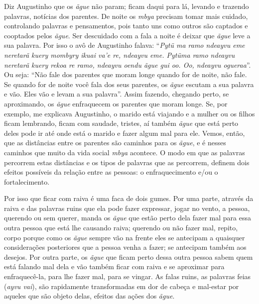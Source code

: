 Diz Augustinho que os \emph{ãgue} não param; ficam daqui para lá,
levando e trazendo palavras, notícias dos parentes. De noite os
\emph{mbya} precisam tomar mais cuidado, controlando palavras e
pensamentos, pois tanto uns como outros são captados e cooptados pelos
\emph{ãgue}. Ser descuidado com a fala a noite é deixar que \emph{ãgue}
leve a sua palavra. Por isso o avô de Augustinho falava: ``\emph{Pytü ma
ramo ndeayvu eme neretarã kuery mombyry ikuai va'e re, ndeayvu eme.
Pytüma ramo ndeayvu neretarã kuery rekoa re ramo, ndeayvu oendu ãgue gui
oo. Oo, ndeayvu ogueraa}''. Ou seja: ``Não fale dos parentes que moram
longe quando for de noite, não fale. Se quando for de noite você fala
dos seus parentes, os \emph{ãgue} escutam a sua palavra e vão. Eles vão
e levam a sua palavra''. Assim fazendo, chegando perto, se aproximando,
os \emph{ãgue} enfraquecem os parentes que moram longe. Se, por exemplo,
me explicava Augustinho, o marido está viajando e a mulher ou os filhos
ficam lembrando, ficam com saudade, tristes, aí também \emph{ãgue} que
está perto deles pode ir até onde está o marido e fazer algum mal para
ele. Vemos, então, que as distâncias entre os parentes são caminhos para
os \emph{ãgue}, e é nesses caminhos que muito da vida social \emph{mbya}
acontece. O modo em que as palavras percorrem estas distâncias e os
tipos de palavras que as percorrem, definem dois efeitos possíveis da
relação entre as pessoas: o enfraquecimento e/ou o fortalecimento.

Por isso que ficar com raiva é uma faca de dois gumes. Por uma parte,
através da raiva e das palavras ruins que ela pode fazer expressar,
jogar no vento, a pessoa, querendo ou sem querer, manda os \emph{ãgue}
que estão perto dela fazer mal para essa outra pessoa que está lhe
causando raiva; querendo ou não fazer mal, repito, corpo porque como os
\emph{ãgue} sempre vão na frente eles se antecipam a quaisquer
considerações posteriores que a pessoa venha a fazer; se antecipam
também aos desejos. Por outra parte, os \emph{ãgue} que ficam perto
dessa outra pessoa sabem quem está falando mal dela e vão também ficar
com raiva e se aproximar para enfraquecê-la, para lhe fazer mal, para se
vingar. As falas ruins, as palavras feias (\emph{ayvu vai}), são
rapidamente transformadas em dor de cabeça e mal-estar por aqueles que
são objeto delas, efeitos das ações dos \emph{ãgue}.

\protect\hypertarget{OLE_LINK19}{}{\protect\hypertarget{OLE_LINK18}{}{}}

